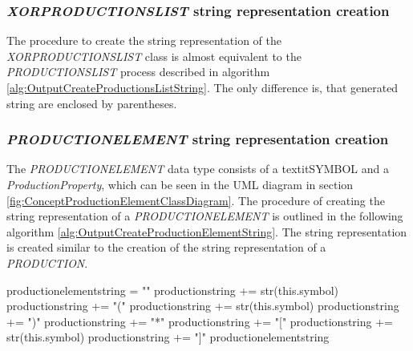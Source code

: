 \subsubsection{\textit{XOR\textunderscore PRODUCTIONS\textunderscore LIST} string representation creation}
The procedure to create the string representation of the \textit{XOR\textunderscore PRODUCTIONS\textunderscore LIST} class is almost equivalent to the \textit{PRODUCTIONS\textunderscore LIST} process described in algorithm \ref{alg:OutputCreateProductionsListString}. The only difference is, that generated string are enclosed by parentheses.
\subsubsection{\textit{PRODUCTION\textunderscore ELEMENT} string representation creation}

The \textit{PRODUCTION\textunderscore ELEMENT} data type consists of a textit{SYMBOL} and a \textit{ProductionProperty}, which can be seen in the UML diagram in section \ref{fig:ConceptProductionElementClassDiagram}.
The procedure of creating the string representation of a \textit{PRODUCTION\textunderscore ELEMENT} is outlined in the following algorithm \ref{alg:OutputCreateProductionElementString}. The string representation is created similar to the creation of the string representation of a \textit{PRODUCTION}.

\begin{algorithm}[H]
\caption{\textit{PRODUCTION\textunderscore ELEMENT}  string creation}
\label{alg:OutputCreateProductionElementString}
\begin{algorithmic}[1]
\State production\textunderscore element\textunderscore string = ""
		\State production\textunderscore string += str(this.symbol)
		\State production\textunderscore string += "("
		\State production\textunderscore string += str(this.symbol)
		\State production\textunderscore string += ")"
		\State production\textunderscore string += "*"
		\State production\textunderscore string += "["
		\State production\textunderscore string += str(this.symbol)
		\State production\textunderscore string += "]"
	\EndIf
\State production\textunderscore element\textunderscore string
\end{algorithmic}
\end{algorithm}

